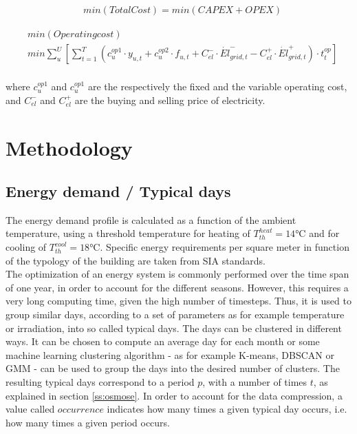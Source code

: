 \documentclass{article}
\begin{document}
\begin{align}
& min \left( TotalCost \right)  = min \left(  CAPEX + OPEX \right) 
\end{align}

\begin{align}
& min \left( Operating cost \right) \\
& min \sum_{u}^{U} \left[ \sum_{t = 1}^{T} \left( c_{u}^{op1} \cdot y_{u,t} + c_{u}^{op2} \cdot f_{u,t} + C_{el}^{-} \cdot \dot{El}_{grid,t}^{-} - C_{el}^{+} \cdot \dot{El}_{grid,t}^{+} \right) \cdot t_{t}^{op} \right] \\
\end{align}

where $c_{u}^{op1}$ and $c_{u}^{op1}$ are the respectively the fixed and the variable operating cost, and $C_{el}^{-}$ and $C_{el}^{+}$ are the buying and selling price of electricity.


\section{Methodology}

\subsection{Energy demand / Typical days}
The energy demand profile is calculated as a function of the ambient temperature\cite{girardinEnerGisGeographicalInformation2010}, using a threshold temperature for heating of $T_{th}^{heat} = 14\si{\celsius}$ and for cooling of $T_{th}^{cool} = 18 \si{\celsius}$. Specific energy requirements per square meter in function of the typology of the building are taken from SIA standards.\\

The optimization of an energy system is commonly performed over the time span of one year, in order to account for the different seasons. However, this requires a very long computing time, given the high number of timesteps. Thus, it is used to group similar days, according to a set of parameters as for example temperature or irradiation, into so called typical days. The days can be clustered in different ways. It can be chosen to compute an average day for each month or some machine learning clustering algorithm - as for example K-means, DBSCAN or GMM - can be used to group the days into the desired number of clusters.
The resulting typical days correspond to a period $p$, with a number of times $t$, as explained in section \ref{ss:osmose}. In order to account for the data compression, a value called $occurrence$ indicates how many times a given typical day occurs, i.e. how many times a given period occurs.
\end{document}
